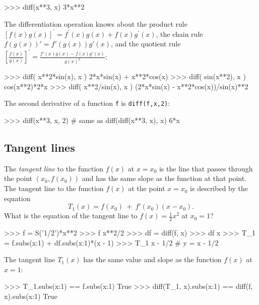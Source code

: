 \small
\begin{verbatimtab}
>>> diff(x**3, x)
3*x**2
\end{verbatimtab}
\normalsize

\noindent
The differentiation operation knows about the product rule $[f(x)g(x)]^\prime=f^\prime(x)g(x)+f(x)g^\prime(x)$, 
the chain rule $f(g(x))' = f'(g(x))g'(x)$, 
and the quotient rule $\left[\frac{f(x)}{g(x)}\right]^\prime = \frac{f'(x)g(x) - f(x)g'(x)}{g(x)^2}$:



\small
\begin{verbatimtab}
>>> diff( x**2*sin(x), x )
2*x*sin(x) + x**2*cos(x)
>>> diff( sin(x**2), x )
cos(x**2)*2*x
>>> diff( x**2/sin(x), x )
(2*x*sin(x) - x**2*cos(x))/sin(x)**2
\end{verbatimtab}
\normalsize

\noindent
The second derivative of a function \texttt{f} is \texttt{diff(f,x,2)}:



\small
\begin{verbatimtab}
>>> diff(x**3, x, 2)       # same as diff(diff(x**3, x), x)
6*x
\end{verbatimtab}
\normalsize



\subsection{Tangent lines}
\label{calculus:tangent_lines}

The \emph{tangent line} to the function $f(x)$ at $x=x_0$ is 													
the line that passes through the point $(x_0, f(x_0))$ and has 
the same slope as the function at that point.
The tangent line to the function $f(x)$ at the point $x=x_0$ is described by the equation
\[
   T_1(x) =  f(x_0) \ + \  f'(x_0)(x-x_0).
\]
What is the equation of the tangent line to $f(x)=\frac{1}{2}x^2$ at $x_0=1$?



\small
\begin{verbatimtab}
>>> f = S('1/2')*x**2
>>> f
x**2/2
>>> df = diff(f, x)
>>> df
x
>>> T_1 = f.subs({x:1}) + df.subs({x:1})*(x - 1)
>>> T_1
x - 1/2           #  y = x - 1/2
\end{verbatimtab}
\normalsize

\noindent
The tangent line $T_1(x)$ has the same value and slope as the function $f(x)$ at $x=1$:
\small
\begin{verbatimtab}
>>> T_1.subs({x:1}) == f.subs({x:1})
True
>>> diff(T_1, x).subs({x:1}) == diff(f, x).subs({x:1})
True
\end{verbatimtab}
\normalsize

